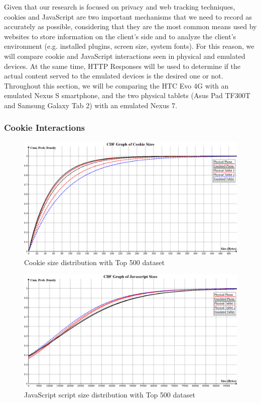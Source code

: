 \documentclass{acm_proc_article-sp}
\begin{document}
Given that our research is focused on privacy and web tracking techniques, cookies and JavaScript are two important mechanisms that we need to record as accurately as possible, considering that they are the most common means used by websites to store information on the client's side and to analyze the client's environment (e.g. installed plugins, screen size, system fonts). For this reason, we will compare cookie and JavaScript interactions seen in physical and emulated devices. At the same time, HTTP Responses will be used to determine if the actual content served to the emulated devices is the desired one or not. Throughout this section, we will be comparing the HTC Evo 4G with an emulated Nexus S smartphone, and the two physical tablets (Asus Pad TF300T and Samsung Galaxy Tab 2) with an emulated Nexus 7.

\subsubsection{Cookie Interactions}


\begin{figure}[ht] 
\centering \includegraphics[scale=0.30]{diagrams/cookies_cdf.png}
\caption{Cookie size distribution with Top 500 dataset}
\label{fig:cookie_cdf}
\end{figure}

\begin{figure}[ht] 
\centering \includegraphics[scale=0.30]{diagrams/javascript_cdf.png}
\caption{JavaScript script size distribution with Top 500 dataset}
\label{fig:javascript_cdf}
\end{figure}
\end{document}
